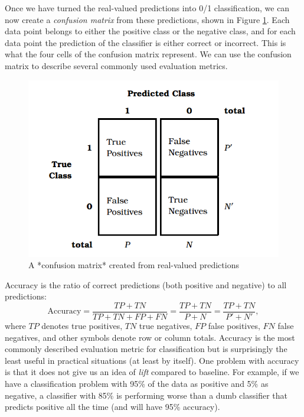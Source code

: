 \documentclass[]{krantz}
\begin{document}
Once we have turned the real-valued predictions into 0/1 classification,
we can now create a \emph{confusion matrix} from these predictions,
shown in Figure \ref{fig:cm}. Each data point belongs to either the
positive class or the negative class, and for each data point the
prediction of the classifier is either correct or incorrect. This is
what the four cells of the confusion matrix represent. We can use the
confusion matrix to describe several commonly used evaluation metrics.

\begin{figure}

{\centering \includegraphics[width=0.7\linewidth]{ChapterML/figures/cm} 

}

\caption{A *confusion matrix* created from real-valued predictions}\label{fig:cm}
\end{figure}

Accuracy is the ratio of correct predictions (both positive and
negative) to all predictions:
\[\textrm{Accuracy}=\frac{TP + TN}{TP + TN + FP + FN}=\frac{TP + TN}{P+N}=\frac{TP + TN}{P'+N'},\]
where \(TP\) denotes true positives, \(TN\) true negatives, \(FP\) false
positives, \(FN\) false negatives, and other symbols denote row or
column totals. Accuracy is the most commonly described evaluation metric
for classification but is surprisingly the least useful in practical
situations (at least by itself). One problem with accuracy is that it
does not give us an idea of \emph{lift} compared to baseline. For
example, if we have a classification problem with 95\% of the data as
positive and 5\% as negative, a classifier with 85\% is performing worse
than a dumb classifier that predicts positive all the time (and will
have 95\% accuracy).
\end{document}
